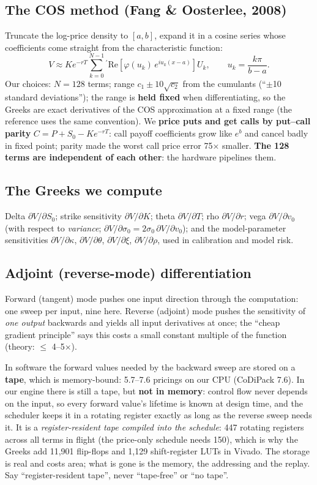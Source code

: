\documentclass[11pt,a4paper]{article}
\begin{document}
\subsection{The COS method (Fang \& Oosterlee, 2008)}
Truncate the log-price density to $[a,b]$, expand it in a cosine series whose coefficients
come straight from the characteristic function:
\[
V \approx K e^{-rT} {\sum_{k=0}^{N-1}}{}^{\prime} \mathrm{Re}\!\left[\varphi(u_k)\,e^{iu_k(x-a)}\right] U_k,
\qquad u_k = \frac{k\pi}{b-a}.
\]
Our choices: $N = 128$ terms; range $c_1 \pm 10\sqrt{c_2}$ from the cumulants (``$\pm$10
standard deviations''); the range is \textbf{held fixed} when differentiating, so the Greeks
are exact derivatives of the COS approximation at a fixed range (the reference uses the same
convention). We \textbf{price puts and get calls by put--call parity}
$C = P + S_0 - Ke^{-rT}$: call payoff coefficients grow like $e^{b}$ and cancel badly in
fixed point; parity made the worst call price error 75$\times$ smaller.
\textbf{The 128 terms are independent of each other}: the hardware pipelines them.

\subsection{The Greeks we compute}
Delta $\partial V/\partial S_0$; strike sensitivity $\partial V/\partial K$; theta
$\partial V/\partial T$; rho $\partial V/\partial r$; vega $\partial V/\partial v_0$ (with
respect to \emph{variance}; $\partial V/\partial\sigma_0 = 2\sigma_0\,\partial V/\partial v_0$);
and the model-parameter sensitivities $\partial V/\partial\kappa$, $\partial V/\partial\theta$,
$\partial V/\partial\xi$, $\partial V/\partial\rho$, used in calibration and model risk.

\subsection{Adjoint (reverse-mode) differentiation}
Forward (tangent) mode pushes one input direction through the computation: one sweep per
input, nine here. Reverse (adjoint) mode pushes the sensitivity of \emph{one output}
backwards and yields all input derivatives at once; the ``cheap gradient principle'' says
this costs a small constant multiple of the function (theory: $\le$ 4--5$\times$).

In software the forward values needed by the backward sweep are stored on a \textbf{tape},
which is memory-bound: 5.7--7.6 pricings on our CPU (CoDiPack 7.6). In our engine there is
still a tape, but \textbf{not in memory}: control flow never depends on the input, so every forward value's
lifetime is known at design time, and the scheduler keeps it in a rotating register exactly as
long as the reverse sweep needs it. It is a \emph{register-resident tape compiled into the
schedule}: 447 rotating registers across all terms in flight (the price-only schedule needs 150),
which is why the Greeks add 11,901 flip-flops and 1,129 shift-register LUTs in Vivado. The
storage is real and costs area; what is gone is the memory, the addressing and the replay. Say
``register-resident tape'', never ``tape-free'' or ``no tape''.
\end{document}
